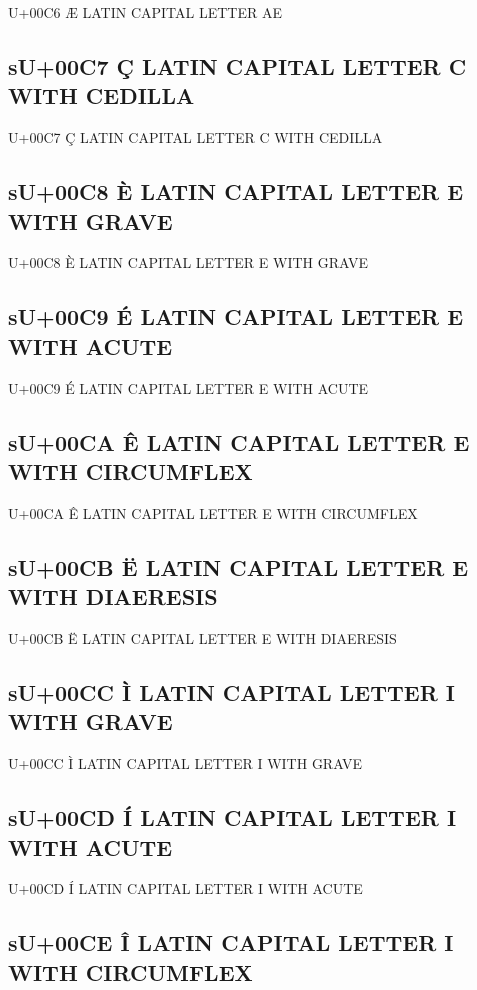 U+00C6 Æ  LATIN CAPITAL LETTER AE

\subsection{sU+00C7 Ç  LATIN CAPITAL LETTER C WITH CEDILLA}

U+00C7 Ç  LATIN CAPITAL LETTER C WITH CEDILLA

\subsection{sU+00C8 È  LATIN CAPITAL LETTER E WITH GRAVE}

U+00C8 È  LATIN CAPITAL LETTER E WITH GRAVE

\subsection{sU+00C9 É  LATIN CAPITAL LETTER E WITH ACUTE}

U+00C9 É  LATIN CAPITAL LETTER E WITH ACUTE

\subsection{sU+00CA Ê  LATIN CAPITAL LETTER E WITH CIRCUMFLEX}

U+00CA Ê  LATIN CAPITAL LETTER E WITH CIRCUMFLEX

\subsection{sU+00CB Ë  LATIN CAPITAL LETTER E WITH DIAERESIS}

U+00CB Ë  LATIN CAPITAL LETTER E WITH DIAERESIS

\subsection{sU+00CC Ì  LATIN CAPITAL LETTER I WITH GRAVE}

U+00CC Ì  LATIN CAPITAL LETTER I WITH GRAVE

\subsection{sU+00CD Í  LATIN CAPITAL LETTER I WITH ACUTE}

U+00CD Í  LATIN CAPITAL LETTER I WITH ACUTE

\subsection{sU+00CE Î  LATIN CAPITAL LETTER I WITH CIRCUMFLEX}

